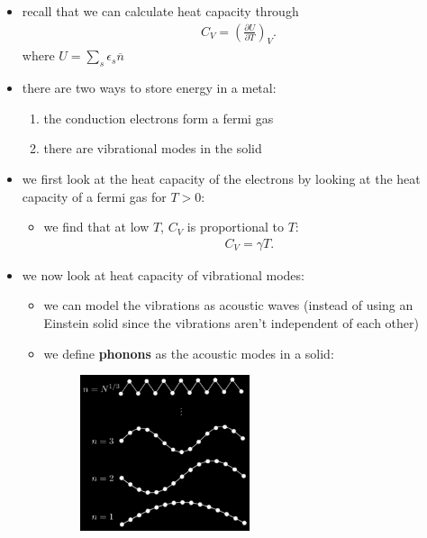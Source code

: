 \documentclass[10pt]{article}
\begin{document}
\begin{itemize}
    \item recall that we can calculate heat capacity through 
        \begin{gather*}
            C_V = \left( \frac{\partial U}{\partial T}  \right)_V
        .\end{gather*}
        where $U = \sum_{s} \epsilon_s \overline{n}$
    \item there are two ways to store energy in a metal:
        \begin{enumerate}
            \item the conduction electrons form a fermi gas 
            \item there are vibrational modes in the solid
        \end{enumerate}
    \item we first look at the heat capacity of the electrons by looking at the heat capacity of a fermi gas for $T>0$:
        \begin{itemize}
            \item we find that at low $T$, $C_V$ is proportional to $T$: 
                \begin{gather*}
                    C_V = \gamma T
                .\end{gather*}
        \end{itemize}
    \item we now look at heat capacity of vibrational modes:
        \begin{itemize}
            \item we can model the vibrations as acoustic waves (instead of using an Einstein solid since the vibrations aren't independent of each other)
            \item we define \textbf{phonons} as the acoustic modes in a solid:
                \begin{figure}[H]
                    \centering
                    \includegraphics[width=0.5\textwidth]{phonons}

\end{figure}
\end{itemize}
\end{itemize}
\end{document}
